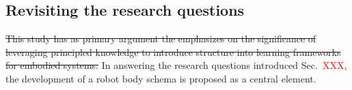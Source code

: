 \documentclass[12pt, a4paper]{article}
\newcommand{\redtext}[1]{\textcolor{red}{#1}}
\begin{document}
%
%
%
%


\subsection*{Revisiting the research questions}
\st{This study has as primary argument the emphasizes on the significance of leveraging principled knowledge to introduce structure into learning frameworks for embodied systems.} In answering the research questions introduced Sec.~\redtext{XXX}, the development of a robot body schema is proposed as a central element. 
\end{document}
